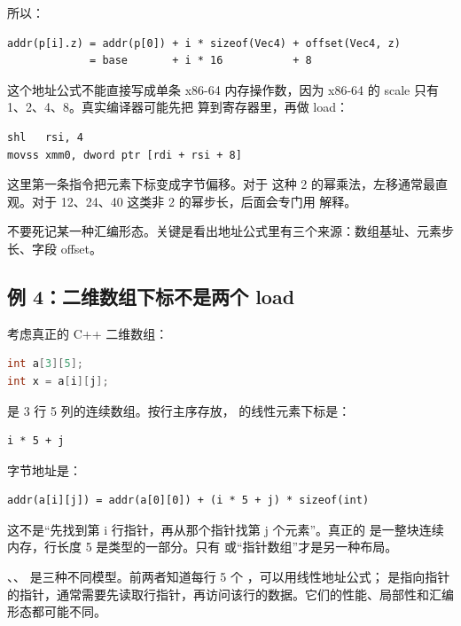 所以：

\begin{lstlisting}
addr(p[i].z) = addr(p[0]) + i * sizeof(Vec4) + offset(Vec4, z)
             = base       + i * 16           + 8
\end{lstlisting}

这个地址公式不能直接写成单条 x86-64 内存操作数，因为 x86-64 的 scale 只有 1、2、4、8。真实编译器可能先把  算到寄存器里，再做 load：

\begin{lstlisting}
shl   rsi, 4
movss xmm0, dword ptr [rdi + rsi + 8]
\end{lstlisting}

这里第一条指令把元素下标变成字节偏移。对于  这种 2 的幂乘法，左移通常最直观。对于 12、24、40 这类非 2 的幂步长，后面会专门用  解释。

不要死记某一种汇编形态。关键是看出地址公式里有三个来源：数组基址、元素步长、字段 offset。

\subsection{例 4：二维数组下标不是两个 load}

考虑真正的 C++ 二维数组：

\begin{lstlisting}[language=C++]
int a[3][5];
int x = a[i][j];
\end{lstlisting}

 是 3 行 5 列的连续数组。按行主序存放， 的线性元素下标是：

\begin{lstlisting}
i * 5 + j
\end{lstlisting}

字节地址是：

\begin{lstlisting}
addr(a[i][j]) = addr(a[0][0]) + (i * 5 + j) * sizeof(int)
\end{lstlisting}

这不是“先找到第 i 行指针，再从那个指针找第 j 个元素”。真正的  是一整块连续内存，行长度 5 是类型的一部分。只有  或“指针数组”才是另一种布局。

\begin{warningbox}
、、 是三种不同模型。前两者知道每行 5 个 ，可以用线性地址公式； 是指向指针的指针，通常需要先读取行指针，再访问该行的数据。它们的性能、局部性和汇编形态都可能不同。
\end{warningbox}

